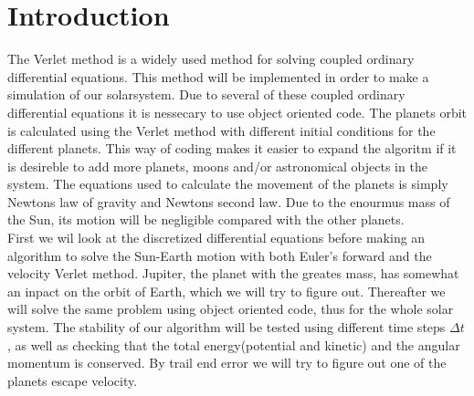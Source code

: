 \documentclass[../main.tex]{subfiles}
\begin{document}
\section{Introduction}\label{introduction}
The Verlet method is a widely used method for solving coupled ordinary differential equations. This method will be implemented  in order to make a simulation of our solarsystem. Due to several of these coupled ordinary differential equations it is nessecary to use object oriented code. The planets orbit is calculated using the Verlet method with different initial conditions for the different planets. This way of coding makes it easier to expand the algoritm if it is desireble to add more planets, moons and/or astronomical objects in the system. The equations used to calculate the movement of the planets is simply Newtons law of gravity and Newtons second law. Due to the enourmus mass of the Sun, its motion will be negligible compared with the other planets.\\
First we wil look at the discretized differential equations before making an algorithm to solve the Sun-Earth motion with both Euler's forward and the velocity Verlet method. Jupiter, the planet with the greates mass, has somewhat an inpact on the orbit of Earth, which we will try to figure out. Thereafter we will solve the same problem using object oriented code, thus for the whole solar system. The stability of our algorithm will be tested using different time steps $\Delta t$, as well as checking that the total energy(potential and kinetic) and the angular momentum is conserved. By trail end error we will try to figure out one of the planets escape velocity.
\end{document}
